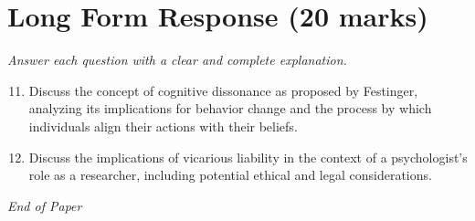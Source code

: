 \documentclass[12pt]{article}
\begin{document}
\section*{Long Form Response (20 marks)}
\textit{Answer each question with a clear and complete explanation.}
\begin{enumerate}[label=\arabic*.]
\setcounter{enumi}{10}
\item Discuss the concept of cognitive dissonance as proposed by Festinger, analyzing its implications for behavior change and the process by which individuals align their actions with their beliefs.
\item Discuss the implications of vicarious liability in the context of a psychologist's role as a researcher, including potential ethical and legal considerations.
\end{enumerate}

\vfill
\noindent\textit{End of Paper}
\end{document}

